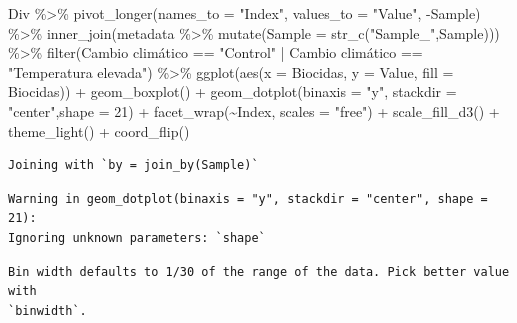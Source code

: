 \documentclass[
  letterpaper,
  DIV=11,
  numbers=noendperiod]{scrartcl}
\newenvironment{Shaded}{\begin{snugshade}}{\end{snugshade}}
\newcommand{\AttributeTok}[1]{\textcolor[rgb]{0.40,0.45,0.13}{#1}}
\newcommand{\DecValTok}[1]{\textcolor[rgb]{0.68,0.00,0.00}{#1}}
\newcommand{\FunctionTok}[1]{\textcolor[rgb]{0.28,0.35,0.67}{#1}}
\newcommand{\NormalTok}[1]{\textcolor[rgb]{0.00,0.23,0.31}{#1}}
\newcommand{\SpecialCharTok}[1]{\textcolor[rgb]{0.37,0.37,0.37}{#1}}
\newcommand{\StringTok}[1]{\textcolor[rgb]{0.13,0.47,0.30}{#1}}
\begin{document}
\begin{Shaded}
\begin{Highlighting}[]
\NormalTok{Div }\SpecialCharTok{\%\textgreater{}\%} 
  \FunctionTok{pivot\_longer}\NormalTok{(}\AttributeTok{names\_to =} \StringTok{"Index"}\NormalTok{, }\AttributeTok{values\_to =} \StringTok{"Value"}\NormalTok{, }\SpecialCharTok{{-}}\NormalTok{Sample) }\SpecialCharTok{\%\textgreater{}\%} 
  \FunctionTok{inner\_join}\NormalTok{(metadata }\SpecialCharTok{\%\textgreater{}\%} 
               \FunctionTok{mutate}\NormalTok{(}\AttributeTok{Sample =} \FunctionTok{str\_c}\NormalTok{(}\StringTok{"Sample\_"}\NormalTok{,Sample))) }\SpecialCharTok{\%\textgreater{}\%} 
  \FunctionTok{filter}\NormalTok{(}\StringTok{\textasciigrave{}}\AttributeTok{Cambio climático}\StringTok{\textasciigrave{}} \SpecialCharTok{==} \StringTok{"Control"} \SpecialCharTok{|} \StringTok{\textasciigrave{}}\AttributeTok{Cambio climático}\StringTok{\textasciigrave{}} \SpecialCharTok{==} \StringTok{"Temperatura elevada"}\NormalTok{) }\SpecialCharTok{\%\textgreater{}\%} 
  \FunctionTok{ggplot}\NormalTok{(}\FunctionTok{aes}\NormalTok{(}\AttributeTok{x =}\NormalTok{ Biocidas, }\AttributeTok{y =}\NormalTok{ Value, }\AttributeTok{fill =}\NormalTok{ Biocidas)) }\SpecialCharTok{+} 
  \FunctionTok{geom\_boxplot}\NormalTok{() }\SpecialCharTok{+} 
  \FunctionTok{geom\_dotplot}\NormalTok{(}\AttributeTok{binaxis =} \StringTok{"y"}\NormalTok{, }\AttributeTok{stackdir =} \StringTok{"center"}\NormalTok{,}\AttributeTok{shape =} \DecValTok{21}\NormalTok{) }\SpecialCharTok{+}
  \FunctionTok{facet\_wrap}\NormalTok{(}\SpecialCharTok{\textasciitilde{}}\NormalTok{Index, }\AttributeTok{scales =} \StringTok{"free"}\NormalTok{) }\SpecialCharTok{+}
  \FunctionTok{scale\_fill\_d3}\NormalTok{() }\SpecialCharTok{+} 
  \FunctionTok{theme\_light}\NormalTok{() }\SpecialCharTok{+} \FunctionTok{coord\_flip}\NormalTok{()}
\end{Highlighting}
\end{Shaded}

\begin{verbatim}
Joining with `by = join_by(Sample)`
\end{verbatim}

\begin{verbatim}
Warning in geom_dotplot(binaxis = "y", stackdir = "center", shape = 21):
Ignoring unknown parameters: `shape`
\end{verbatim}

\begin{verbatim}
Bin width defaults to 1/30 of the range of the data. Pick better value with
`binwidth`.
\end{verbatim}
\end{document}
